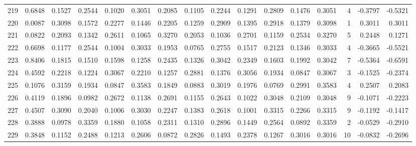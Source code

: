 \begin{tabular}{lrrrrrrrrrrrrrrr}
219 &      0.6848 &  0.1527 &  0.2544 &  0.1020 &  0.3051 &  0.2085 &  0.1105 &  0.2244 &  0.1291 &  0.2809 &   0.1476 &     0.3051 &      4 &                   -0.3797 &                    -0.5321 \\
220 &      0.0087 &  0.3098 &  0.1572 &  0.2277 &  0.1446 &  0.2205 &  0.1259 &  0.2909 &  0.1395 &  0.2918 &   0.1379 &     0.3098 &      1 &                    0.3011 &                     0.3011 \\
221 &      0.0822 &  0.2093 &  0.1342 &  0.2611 &  0.1065 &  0.3270 &  0.2053 &  0.1036 &  0.2701 &  0.1159 &   0.2534 &     0.3270 &      5 &                    0.2448 &                     0.1271 \\
222 &      0.6698 &  0.1177 &  0.2544 &  0.1004 &  0.3033 &  0.1953 &  0.0765 &  0.2755 &  0.1517 &  0.2123 &   0.1346 &     0.3033 &      4 &                   -0.3665 &                    -0.5521 \\
223 &      0.8406 &  0.1815 &  0.1510 &  0.1598 &  0.1258 &  0.2435 &  0.1326 &  0.3042 &  0.2349 &  0.1603 &   0.1992 &     0.3042 &      7 &                   -0.5364 &                    -0.6591 \\
224 &      0.4592 &  0.2218 &  0.1224 &  0.3067 &  0.2210 &  0.1257 &  0.2881 &  0.1376 &  0.3056 &  0.1934 &   0.0847 &     0.3067 &      3 &                   -0.1525 &                    -0.2374 \\
225 &      0.1076 &  0.3159 &  0.1934 &  0.0847 &  0.3583 &  0.1849 &  0.0883 &  0.3019 &  0.1976 &  0.0769 &   0.2991 &     0.3583 &      4 &                    0.2507 &                     0.2083 \\
226 &      0.4119 &  0.1896 &  0.0982 &  0.2672 &  0.1138 &  0.2691 &  0.1155 &  0.2643 &  0.1022 &  0.3048 &   0.2109 &     0.3048 &      9 &                   -0.1071 &                    -0.2223 \\
227 &      0.4507 &  0.3090 &  0.2040 &  0.1006 &  0.3030 &  0.2247 &  0.1383 &  0.2618 &  0.1001 &  0.3315 &   0.2266 &     0.3315 &      9 &                   -0.1192 &                    -0.1417 \\
228 &      0.3888 &  0.0978 &  0.3359 &  0.1880 &  0.1058 &  0.2311 &  0.1310 &  0.2896 &  0.1449 &  0.2564 &   0.0892 &     0.3359 &      2 &                   -0.0529 &                    -0.2910 \\
229 &      0.3848 &  0.1152 &  0.2488 &  0.1213 &  0.2606 &  0.0872 &  0.2826 &  0.1493 &  0.2378 &  0.1267 &   0.3016 &     0.3016 &     10 &                   -0.0832 &                    -0.2696 \\

\end{tabular}
